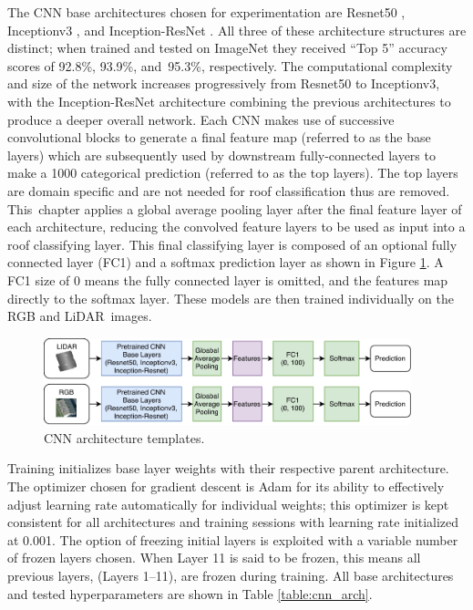 The \ac{CNN} base architectures chosen for experimentation are Resnet50 \cite{he_deep_2016}, Inceptionv3 \cite{szegedy_rethinking_2016}, and Inception-ResNet \cite{szegedy_inception-v4_2017}.  All three of these architecture structures are distinct; when trained and tested on ImageNet \cite{russakovsky_imagenet_2015} they received ``Top    5'' accuracy scores of 92.8\%,   93.9\%, and~95.3\%, respectively.
The computational complexity and size of the network increases progressively from Resnet50  %
to Inceptionv3, with the Inception-ResNet architecture combining the previous architectures to produce a deeper overall network.   Each \ac{CNN} makes use of successive convolutional blocks to generate a final feature map (referred to as the base layers) which are subsequently used by downstream fully-connected layers to make a 1000 categorical prediction (referred to as the top layers). The top layers are domain specific and are not needed for roof classification thus are removed. This~chapter applies a global average pooling layer after the final feature layer of each architecture, reducing the convolved feature layers to be used as input into a roof classifying layer.  This final classifying layer is composed of an optional fully connected layer (FC1) and a softmax prediction layer as shown in Figure \ref{fig:cnn_architectures}. A FC1 size of 0 means the fully connected layer is omitted, and the features map directly to the softmax layer.  These models are then trained individually on the RGB and LiDAR~images.

\begin{figure}[h]
\centering
\includegraphics[width=0.95\textwidth]{chapter_4_roofshape/imgs/CNN_Template.pdf}
\caption{CNN architecture templates.}
\label{fig:cnn_architectures}
\end{figure}

Training initializes base layer weights with their respective parent architecture. The optimizer chosen for gradient descent is Adam \cite{kingma_adam_2017} for its ability to effectively adjust learning rate automatically for individual weights; this optimizer is kept consistent for all architectures and training sessions with learning rate initialized at 0.001. The option of freezing initial layers is exploited with a variable number of frozen layers chosen. When Layer 11 is said to be frozen, this means all previous layers, (Layers 1--11), are frozen during training. All base architectures and tested hyperparameters are shown in Table \ref{table:cnn_arch}.  


